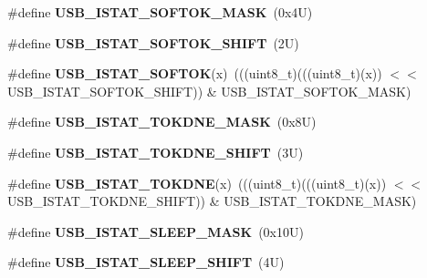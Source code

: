 \begin{DoxyCompactItemize}
\#define {\bfseries U\+S\+B\+\_\+\+I\+S\+T\+A\+T\+\_\+\+S\+O\+F\+T\+O\+K\+\_\+\+M\+A\+SK}~(0x4\+U)
\item 
\mbox{\label{group___u_s_b___register___masks_gae58407103a8cebfc9c4a8e8c7f08fddb}} 
\#define {\bfseries U\+S\+B\+\_\+\+I\+S\+T\+A\+T\+\_\+\+S\+O\+F\+T\+O\+K\+\_\+\+S\+H\+I\+FT}~(2\+U)
\item 
\mbox{\label{group___u_s_b___register___masks_ga3dec5ce053bffc80185a8b784eb76dcc}} 
\#define {\bfseries U\+S\+B\+\_\+\+I\+S\+T\+A\+T\+\_\+\+S\+O\+F\+T\+OK}(x)~(((uint8\+\_\+t)(((uint8\+\_\+t)(x)) $<$$<$ U\+S\+B\+\_\+\+I\+S\+T\+A\+T\+\_\+\+S\+O\+F\+T\+O\+K\+\_\+\+S\+H\+I\+FT)) \& U\+S\+B\+\_\+\+I\+S\+T\+A\+T\+\_\+\+S\+O\+F\+T\+O\+K\+\_\+\+M\+A\+SK)
\item 
\mbox{\label{group___u_s_b___register___masks_ga12db7650592f7e48ae702b71d1728c98}} 
\#define {\bfseries U\+S\+B\+\_\+\+I\+S\+T\+A\+T\+\_\+\+T\+O\+K\+D\+N\+E\+\_\+\+M\+A\+SK}~(0x8\+U)
\item 
\mbox{\label{group___u_s_b___register___masks_ga55bb01da118027c84423bfcb317eabb5}} 
\#define {\bfseries U\+S\+B\+\_\+\+I\+S\+T\+A\+T\+\_\+\+T\+O\+K\+D\+N\+E\+\_\+\+S\+H\+I\+FT}~(3\+U)
\item 
\mbox{\label{group___u_s_b___register___masks_ga6aa4ea95ad3c62b922ad95fe1edcb4b8}} 
\#define {\bfseries U\+S\+B\+\_\+\+I\+S\+T\+A\+T\+\_\+\+T\+O\+K\+D\+NE}(x)~(((uint8\+\_\+t)(((uint8\+\_\+t)(x)) $<$$<$ U\+S\+B\+\_\+\+I\+S\+T\+A\+T\+\_\+\+T\+O\+K\+D\+N\+E\+\_\+\+S\+H\+I\+FT)) \& U\+S\+B\+\_\+\+I\+S\+T\+A\+T\+\_\+\+T\+O\+K\+D\+N\+E\+\_\+\+M\+A\+SK)
\item 
\mbox{\label{group___u_s_b___register___masks_ga008ba082c8646490852ad753ebcf4e62}} 
\#define {\bfseries U\+S\+B\+\_\+\+I\+S\+T\+A\+T\+\_\+\+S\+L\+E\+E\+P\+\_\+\+M\+A\+SK}~(0x10\+U)
\item 
\mbox{\label{group___u_s_b___register___masks_ga724873614965bae7c2d6c45aa4731f70}} 
\#define {\bfseries U\+S\+B\+\_\+\+I\+S\+T\+A\+T\+\_\+\+S\+L\+E\+E\+P\+\_\+\+S\+H\+I\+FT}~(4\+U)

\end{DoxyCompactItemize}
